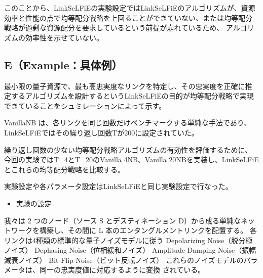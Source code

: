 \documentclass[technicalreport,dvipdfmx]{ieicej}
\begin{document}
このことから、LinkSeLFiEの実験設定ではLinkSeLFiEのアルゴリズムが、資源
効率と性能の点で均等配分戦略を上回ることができていない、または均等配分
戦略が過剰な資源配分を要求しているという前提が崩れているため、
アルゴリズムの効率性を示せていない。
\subsection{E（Example：具体例）}
\label{sec:org2563098}
最小限の量子資源で、最も高忠実度なリンクを特定し、その忠実度を正確に推
定するアルゴリズムを設計するというLinkSeLFiEの目的が均等配分戦略で実現
できていることをシュミレーションによって示す。

VanillaNB は、各リンクを同じ回数だけベンチマークする単純な手法であり、
LinkSeLFiEではその繰り返し回数Tが200に設定されていた。

繰り返し回数の少ない均等配分戦略アルゴリズムの有効性を評価するために、
今回の実験ではT=4とT=20のVanilla 4NB、Vanilla 20NBを実装し、LinkSeLFiE
とこれらの均等配分戦略を比較する。

実験設定や各パラメータ設定はLinkSeLFiEと同じ実験設定で行なった。

\begin{itemize}
\item 実験の設定
\end{itemize}
我々は 2 つのノード（ソース S とデスティネーション D）から成る単純なネッ
トワークを構築し、その間に L 本のエンタングルメントリンクを配置する。
各リンクは4種類の標準的な量子ノイズモデルに従う
Depolarizing Noise（脱分極ノイズ）
Dephasing Noise（位相緩和ノイズ）
Amplitude Damping Noise（振幅減衰ノイズ）
Bit-Flip Noise（ビット反転ノイズ）
これらのノイズモデルのパラメータは、同一の忠実度値に対応するように変換
されている。
\end{document}
